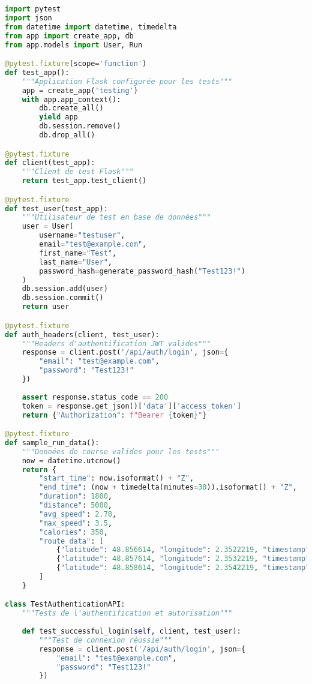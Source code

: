 \begin{lstlisting}[language=python, caption=Suite de tests API complète]
import pytest
import json
from datetime import datetime, timedelta
from app import create_app, db
from app.models import User, Run

@pytest.fixture(scope='function')
def test_app():
    """Application Flask configurée pour les tests"""
    app = create_app('testing')
    with app.app_context():
        db.create_all()
        yield app
        db.session.remove()
        db.drop_all()

@pytest.fixture
def client(test_app):
    """Client de test Flask"""
    return test_app.test_client()

@pytest.fixture
def test_user(test_app):
    """Utilisateur de test en base de données"""
    user = User(
        username="testuser",
        email="test@example.com",
        first_name="Test",
        last_name="User",
        password_hash=generate_password_hash("Test123!")
    )
    db.session.add(user)
    db.session.commit()
    return user

@pytest.fixture
def auth_headers(client, test_user):
    """Headers d'authentification JWT valides"""
    response = client.post('/api/auth/login', json={
        "email": "test@example.com",
        "password": "Test123!"
    })
    
    assert response.status_code == 200
    token = response.get_json()['data']['access_token']
    return {"Authorization": f"Bearer {token}"}

@pytest.fixture
def sample_run_data():
    """Données de course valides pour les tests"""
    now = datetime.utcnow()
    return {
        "start_time": now.isoformat() + "Z",
        "end_time": (now + timedelta(minutes=30)).isoformat() + "Z",
        "duration": 1800,
        "distance": 5000,
        "avg_speed": 2.78,
        "max_speed": 3.5,
        "calories": 350,
        "route_data": [
            {"latitude": 48.856614, "longitude": 2.3522219, "timestamp": now.timestamp()},
            {"latitude": 48.857614, "longitude": 2.3532219, "timestamp": (now + timedelta(minutes=15)).timestamp()},
            {"latitude": 48.858614, "longitude": 2.3542219, "timestamp": (now + timedelta(minutes=30)).timestamp()}
        ]
    }

class TestAuthenticationAPI:
    """Tests de l'authentification et autorisation"""
    
    def test_successful_login(self, client, test_user):
        """Test de connexion réussie"""
        response = client.post('/api/auth/login', json={
            "email": "test@example.com",
            "password": "Test123!"
        })
        

\end{lstlisting}
